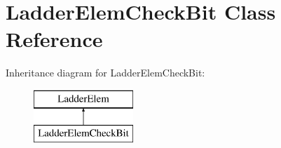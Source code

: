 \hypertarget{class_ladder_elem_check_bit}{\section{Ladder\-Elem\-Check\-Bit Class Reference}
\label{class_ladder_elem_check_bit}
}
Inheritance diagram for Ladder\-Elem\-Check\-Bit\-:\begin{figure}[H]
\begin{center}
\leavevmode
\includegraphics[height=2.000000cm]{class_ladder_elem_check_bit}
\end{center}
\end{figure}
